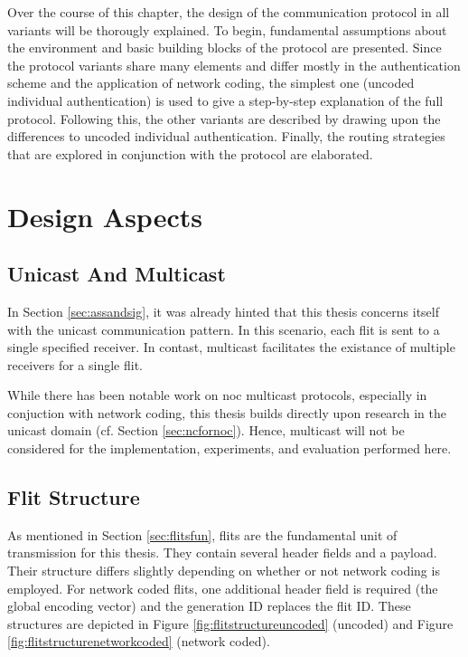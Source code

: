 Over the course of this chapter, the design of the communication protocol in all variants will be thorougly explained. To begin, fundamental
assumptions about the environment and basic building blocks of the protocol are presented. Since the protocol variants share many elements and differ
mostly in the authentication scheme and the application of network coding, the simplest one (uncoded individual authentication) is used to give a
step-by-step explanation of the full protocol. Following this, the other variants are described by drawing upon the differences to uncoded individual
authentication. Finally, the routing strategies that are explored in conjunction with the protocol are elaborated.

\section{Design Aspects}
\subsection{Unicast And Multicast}
In Section \ref{sec:assandsig}, it was already hinted that this thesis concerns itself with the unicast communication pattern. In this scenario, each
flit is sent to a single specified receiver. In contast, multicast facilitates the existance of multiple receivers for a single flit.

While there has been notable work on \gls{noc} multicast protocols, especially in conjuction with network coding, this thesis builds directly upon
research in the unicast domain (cf. Section \ref{sec:ncfornoc}). Hence, multicast will not be considered for the implementation, experiments, and
evaluation performed here.

\subsection{Flit Structure}\label{subsec:flitstructure}
As mentioned in Section \ref{sec:flitsfun}, flits are the fundamental unit of transmission for this thesis. They contain several header fields and a
payload. Their structure differs slightly depending on whether or not network coding is employed. For network coded flits, one additional
header field is required (the global encoding vector) and the generation ID replaces the flit ID. These structures are depicted in Figure
\vref{fig:flitstructureuncoded} (uncoded) and Figure \ref{fig:flitstructurenetworkcoded} (network coded).

